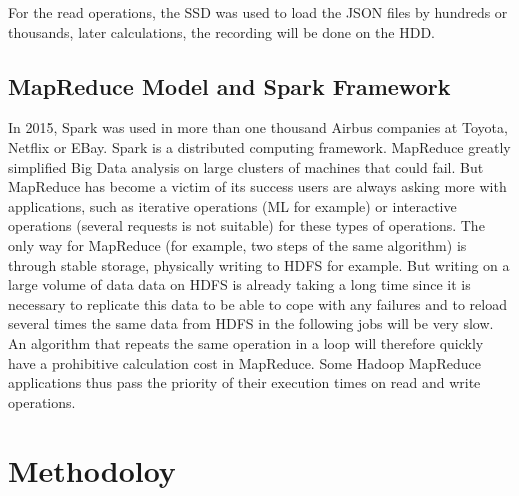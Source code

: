 \documentclass{acmtog} %
\begin{document}
For the read operations, the SSD was used to load the JSON files by hundreds or thousands, later calculations, the recording will be done on the HDD.

\subsection{MapReduce Model and Spark Framework}
\label{subsub:mapreduce_spark}

In 2015, Spark was used in more than one thousand Airbus companies at Toyota, Netflix or EBay. Spark is a distributed computing framework. MapReduce greatly simplified Big Data analysis on large clusters of machines that could fail. But MapReduce has become a victim of its success users are always asking more with applications, such as iterative operations (ML for example) or interactive operations (several requests is not suitable) for these types of operations. The only way for MapReduce (for example, two steps of the same algorithm) is through stable storage, physically writing to HDFS for example. But writing on a large volume of data data on HDFS is already taking a long time since it is necessary to replicate this data to be able to cope with any failures and to reload several times the same data from HDFS in the following jobs will be very slow. An algorithm that repeats the same operation in a loop will therefore quickly have a prohibitive calculation cost in MapReduce. Some Hadoop MapReduce applications thus pass the priority of their execution times on read and write operations.



\section{Methodoloy}
\label{sec:methodology}
\end{document}
